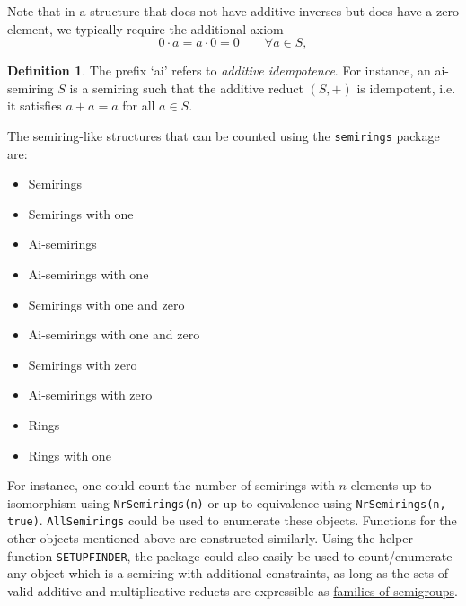 \documentclass{article}
\theoremstyle{definition}
\newtheorem{defn}{Definition}[section]
\theoremstyle{plain}
\begin{document}
Note that in a structure that does not have additive inverses but
does have a zero element, we typically require the additional axiom
\begin{equation}
  \label{eq:rig-axiom}
  0\cdot a=a\cdot0=0\qquad\forall a\in S,
\end{equation}

\begin{defn}
  The prefix `ai' refers to \emph{additive idempotence}. For
  instance, an ai-semiring \(S\) is a semiring such that the additive
  reduct $(S, +)$ is idempotent, i.e. it satisfies \(a + a = a\) for
  all \(a\in S\).
\end{defn}

The semiring-like structures that can be counted using the
\texttt{semirings} package are:

\begin{multicols}{2}
  \begin{itemize}
    \item Semirings
    \item Semirings with one
    \item Ai-semirings
    \item Ai-semirings with one
    \item Semirings with one and zero
    \item Ai-semirings with one and zero
    \item Semirings with zero
    \item Ai-semirings with zero
    \item Rings
    \item Rings with one
  \end{itemize}
\end{multicols}

For instance, one could count the number of semirings with \(n\)
elements up to isomorphism using \texttt{NrSemirings(n)} or up to
equivalence using \texttt{NrSemirings(n, true)}.
\texttt{AllSemirings} could be used to enumerate these objects.
Functions for the other objects mentioned above are constructed
similarly. Using the helper function \texttt{SETUPFINDER}, the
package could also easily be used to count/enumerate any object which
is a semiring with additional constraints, as long as the sets of
valid additive and multiplicative reducts are expressible as
\href{https://gap-packages.github.io/smallsemi/doc/chap4_mj.html#X82F9C36C86006857}{families
of semigroups}.
\end{document}
